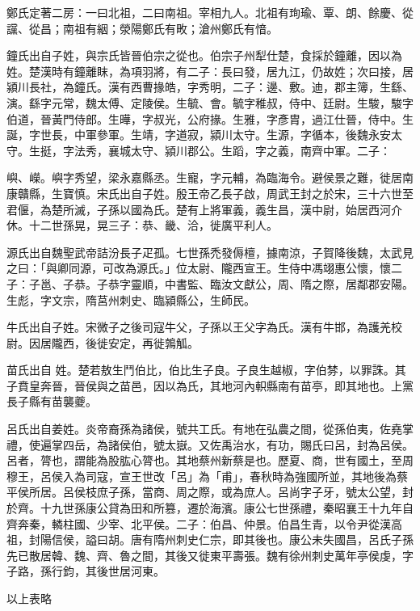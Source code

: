 \begin{pinyinscope}
 鄭氏定著二房：一曰北祖，二曰南祖。宰相九人。北祖有珣瑜、覃、朗、餘慶、從讜、從昌；南祖有絪；滎陽鄭氏有畋；滄州鄭氏有愔。



 鐘氏出自子姓，與宗氏皆晉伯宗之從也。伯宗子州犁仕楚，食採於鐘離，因以為姓。楚漢時有鐘離眜，為項羽將，有二子：長曰發，居九江，仍故姓；次曰接，居潁川長社，為鐘氏。漢有西曹掾皓，字秀明，二子：邊、敷。迪，郡主簿，生繇、演。繇字元常，魏太傅、定陵侯。生毓、會。毓字稚叔，侍中、廷尉。生駿，駿字伯道，晉黃門侍郎。生曄，字叔光，公府掾。生雅，字彥胄，過江仕晉，侍中。生誕，字世長，中軍參軍。生靖，字道寂，潁川太守。生源，字循本，後魏永安太守。生挺，字法秀，襄城太守、潁川郡公。生蹈，字之義，南齊中軍。二子：



 嶼、嶸。嶼字秀望，梁永嘉縣丞。生寵，字元輔，為臨海令。避侯景之難，徙居南康贛縣，生寶慎。宋氏出自子姓。殷王帝乙長子啟，周武王封之於宋，三十六世至君偃，為楚所滅，子孫以國為氏。楚有上將軍義，義生昌，漢中尉，始居西河介休。十二世孫晃，晃三子：恭、畿、洽，徙廣平利人。



 源氏出自魏聖武帝詰汾長子疋孤。七世孫禿發傉檀，據南涼，子賀降後魏，太武見之曰：「與卿同源，可改為源氏。」位太尉、隴西宣王。生侍中馮翊惠公懷，懷二子：子邕、子恭。子恭字靈順，中書監、臨汝文獻公，周、隋之際，居鄰郡安陽。生彪，字文宗，隋莒州刺史、臨潁縣公，生師民。



 牛氏出自子姓。宋微子之後司寇牛父，子孫以王父字為氏。漢有牛邯，為護羌校尉。因居隴西，後徙安定，再徙鶉觚。


苗氏出自
 姓。楚若敖生鬥伯比，伯比生子良。子良生越椒，字伯棼，以罪誅。其子賁皇奔晉，晉侯與之苗邑，因以為氏，其地河內軹縣南有苗亭，即其地也。上黨長子縣有苗襲夔。



 呂氏出自姜姓。炎帝裔孫為諸侯，號共工氏。有地在弘農之間，從孫伯夷，佐堯掌禮，使遍掌四岳，為諸侯伯，號太嶽。又佐禹治水，有功，賜氏曰呂，封為呂侯。呂者，膂也，謂能為股肱心膂也。其地蔡州新蔡是也。歷夏、商，世有國土，至周穆王，呂侯入為司寇，宣王世改「呂」為「甫」，春秋時為強國所並，其地後為蔡平侯所居。呂侯枝庶子孫，當商、周之際，或為庶人。呂尚字子牙，號太公望，封於齊。十九世孫康公貸為田和所篡，遷於海濱。康公七世孫禮，秦昭襄王十九年自齊奔秦，轔柱國、少宰、北平侯。二子：伯昌、仲景。伯昌生青，以令尹從漢高祖，封陽信侯，謚曰胡。唐有隋州刺史仁宗，即其後也。康公未失國昌，呂氏子孫先已散居韓、魏、齊、魯之間，其後又徙東平壽張。魏有徐州刺史萬年亭侯虔，字子路，孫行鈞，其後世居河東。



 以上表略



\end{pinyinscope}